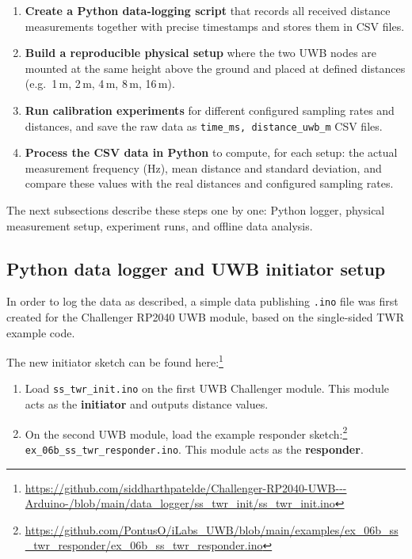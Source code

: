 \documentclass[a4paper,11pt]{article}
\begin{document}
	\begin{tcolorbox}[title=Objectives of this section,
		colback=accentlight!60!white,
		sharp corners]
		\begin{enumerate}
			\item \textbf{Create a Python data-logging script} that records all received
			distance measurements together with precise timestamps and stores them
			in CSV files.
			\item \textbf{Build a reproducible physical setup} where the two UWB nodes
			are mounted at the same height above the ground and placed at defined
			distances (e.g.\ 1\,m, 2\,m, 4\,m, 8\,m, 16\,m).
			\item \textbf{Run calibration experiments} for different configured sampling
			rates and distances, and save the raw data as
			\texttt{time\_ms, distance\_uwb\_m} CSV files.
			\item \textbf{Process the CSV data in Python} to compute, for each setup:
			the actual measurement frequency (Hz), mean distance and standard
			deviation, and compare these values with the real distances and
			configured sampling rates.
		\end{enumerate}
	\end{tcolorbox}
	
	The next subsections describe these steps one by one: Python logger, physical
	measurement setup, experiment runs, and offline data analysis.
	
	\subsection{Python data logger and UWB initiator setup}
	\label{subsec:uwb-logger-setup}
	
	 In order to log the data as described, a simple data publishing
	\texttt{.ino} file was first created for the Challenger RP2040 UWB module,
	based on the single-sided TWR example code.
	
	The new initiator sketch can be found here:\footnote{\url{https://github.com/siddharthpatelde/Challenger-RP2040-UWB---Arduino-/blob/main/data_logger/ss_twr_init/ss_twr_init.ino}}
	
	\begin{tcolorbox}[title=UWB initiator and responder setup,
		colback=accentlight!60!white,
		sharp corners]
		\begin{enumerate}
			\item Load \texttt{ss\_twr\_init.ino} on the first UWB Challenger module.  
			This module acts as the \textbf{initiator} and outputs distance values.
			\item On the second UWB module, load the example responder sketch:\footnote{\url{https://github.com/PontusO/iLabs_UWB/blob/main/examples/ex_06b_ss_twr_responder/ex_06b_ss_twr_responder.ino}}  
			\texttt{ex\_06b\_ss\_twr\_responder.ino}.  
			This module acts as the \textbf{responder}.
		\end{enumerate}
	\end{tcolorbox}
	
\end{document}
